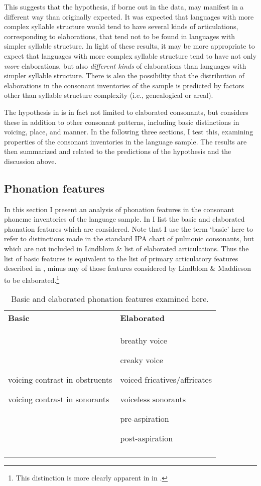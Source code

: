   This suggests that the hypothesis, if borne out in the data, may manifest in a different way than originally expected. It was expected that languages with more complex syllable structure would tend to have several kinds of articulations, corresponding to elaborations, that tend not to be found in languages with simpler syllable structure. In light of these results, it may be more appropriate to expect that languages with more complex syllable structure tend to have not only \textit{more} elaborations, but also \textit{different kinds} of elaborations than languages with simpler syllable structure. There is also the possibility that the distribution of elaborations in the consonant inventories of the sample is predicted by factors other than syllable structure complexity (i.e., genealogical or areal).

  The hypothesis in  is in fact not limited to elaborated consonants, but considers these in addition to other consonant patterns, including basic distinctions in voicing, place, and manner. In the following three sections, I test this, examining properties of the consonant inventories in the language sample. The results are then summarized and related to the predictions of the hypothesis and the discussion above.

\subsection{Phonation features}\label{sec:4.4.3}

  In this section I present an analysis of phonation features in the consonant phoneme inventories of the language sample. In  I list the basic and elaborated phonation features which are considered. Note that I use the term ‘basic’ here to refer to distinctions made in the standard IPA chart of pulmonic consonants, but which are not included in Lindblom \&  list of elaborated articulations. Thus the list of basic features is equivalent to the list of primary articulatory features described in , minus any of those features considered by Lindblom \& Maddieson to be elaborated.\footnote{{This distinction is more clearly apparent in  in .}}

\begin{table}
\begin{tabularx}{\textwidth}{XX}
\lsptoprule

\textbf{Basic} & \textbf{Elaborated}\\
voicing contrast in obstruents

voicing contrast in sonorants & breathy voice

creaky voice

voiced fricatives/affricates

voiceless sonorants

pre-aspiration

post-aspiration\\
\lspbottomrule
\end{tabularx}
\caption{\label{tab:4.12}Basic and elaborated phonation features examined here.}
\end{table}

